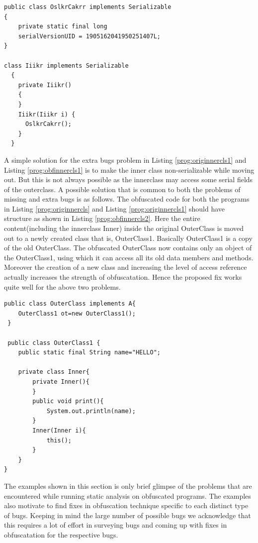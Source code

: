 \documentclass[conference]{IEEEtran}
\begin{document}
\tiny\begin{lstlisting}[frame=single]
 public class OslkrCakrr implements Serializable
{
	private static final long 
	serialVersionUID = 1905162041950251407L;
}

class Iiikr implements Serializable
  {
    private Iiikr()
    {
    }
    Iiikr(Iiikr i) {
      OslkrCakrr();
    }
  }
\end{lstlisting}
\normalsize

A simple solution for the extra bugs problem in Listing \ref{prog:originnercls1} and Listing \ref{prog:obfinnercls1} is to make the inner class non-serializable while moving out. But 
this is not always possible as the innerclass may access some serial fields of the outerclass. A possible solution that is common to both the problems of missing and extra bugs is as 
follows. The obfuscated code for both the programs in Listing \ref{prog:originnercls} and Listing \ref{prog:originnercls1} should have structure as shown in Listing \ref{prog:obfinnercls2}.
Here the entire content(including the innerclass Inner) inside the original OuterClass is moved out to a newly created class that is, OuterClass1. Basically OuterClass1 is a copy of the 
old OuterClass. The obfuscated OuterClass now contains only an object of the OuterClass1, using which it can access all its old data members and methods. Moreover the creation of a new 
class and increasing the level of access reference actually increases the strength of obfuscatation. Hence the proposed fix works quite well for the above two problems.
\tiny\begin{lstlisting}[frame=single]
 public class OuterClass implements A{
	OuterClass1 ot=new OuterClass1();
 }
 
 public class OuterClass1 {
	public static final String name="HELLO";
	
	private class Inner{
		private Inner(){
		}
		public void print(){
			System.out.println(name);
		}
		Inner(Inner i){
			this();
		}
	}
}
\end{lstlisting}
\normalsize

The examples shown in this section is only brief glimpse of the problems that are encountered while running static analysis on obfuscated programs. The examples also motivate to find 
fixes in obfuscation technique specific to each distinct type of bugs. Keeping in mind the large number of possible bugs we acknowledge that this requires a lot of effort in surveying 
bugs and coming up with fixes in obfuscatation for the respective bugs.
\end{document}
